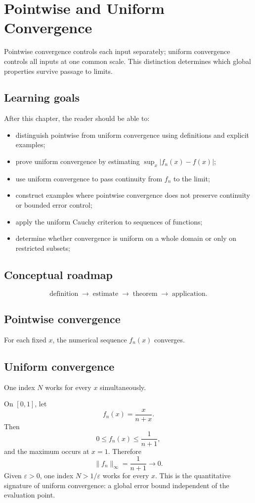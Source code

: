 \chapter{Pointwise and Uniform Convergence}
\label{ch:ii11}

Pointwise convergence controls each input separately; uniform convergence controls all inputs at one common scale. This distinction determines which global properties survive passage to limits.

\section*{Learning goals}
After this chapter, the reader should be able to:
\begin{itemize}
\item distinguish pointwise from uniform convergence using definitions and explicit examples;
\item prove uniform convergence by estimating \(\sup_x|f_n(x)-f(x)|\);
\item use uniform convergence to pass continuity from \(f_n\) to the limit;
\item construct examples where pointwise convergence does not preserve continuity or bounded error control;
\item apply the uniform Cauchy criterion to sequences of functions;
\item determine whether convergence is uniform on a whole domain or only on restricted subsets;
\end{itemize}
\section*{Conceptual roadmap}
\[
\boxed{\text{definition}\;\longrightarrow\;\text{estimate}\;\longrightarrow\;\text{theorem}\;\longrightarrow\;\text{application}.}
\]

\section{Pointwise convergence}
For each fixed $x$, the numerical sequence $f_n(x)$ converges.

\section{Uniform convergence}
One index $N$ works for every $x$ simultaneously.


\begin{example}\label{ex:ii11-expand-01}
On \([0,1]\), let
\[
f_n(x)=\frac{x}{n+x}.
\]
Then
\[
0\le f_n(x)\le\frac1{n+1},
\]
and the maximum occurs at \(x=1\). Therefore
\[
\|f_n\|_\infty=\frac1{n+1}\to0.
\]
Given \(\varepsilon>0\), one index \(N>1/\varepsilon\) works for every \(x\).
This is the quantitative signature of uniform convergence: a global error bound
independent of the evaluation point.
\end{example}
